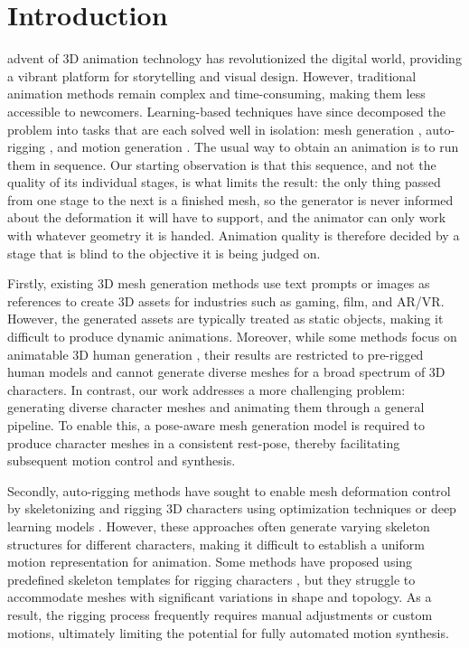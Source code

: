 \documentclass[lettersize,journal]{IEEEtran}
\begin{document}
\section{Introduction}
 advent of 3D animation technology has revolutionized the digital world, providing a vibrant platform for storytelling and visual design. However, traditional animation methods remain complex and time-consuming, making them less accessible to newcomers. Learning-based techniques have since decomposed the problem into tasks that are each solved well in isolation: mesh generation \cite{lei2023s, chen2024meshanything, siddiqui2024meshgpt}, auto-rigging \cite{xu2020rignet, xu2022morig, wang2025foundation}, and motion generation \cite{guo2020action2motion,zhang2024motiondiffuse}. The usual way to obtain an animation is to run them in sequence. Our starting observation is that this sequence, and not the quality of its individual stages, is what limits the result: the only thing passed from one stage to the next is a finished mesh, so the generator is never informed about the deformation it will have to support, and the animator can only work with whatever geometry it is handed. Animation quality is therefore decided by a stage that is blind to the objective it is being judged on.

Firstly, existing 3D mesh generation methods \cite{zhang2024clay, weng2025scaling} use text prompts or images as references to create 3D assets for industries such as gaming, film, and AR/VR. However, the generated assets are typically treated as static objects, making it difficult to produce dynamic animations. Moreover, while some methods focus on animatable 3D human generation \cite{yu2023monohuman, wen2024gomavatar}, their results are restricted to pre-rigged human models and cannot generate diverse meshes for a broad spectrum of 3D characters. In contrast, our work addresses a more challenging problem: generating diverse character meshes and animating them through a general pipeline. To enable this, a pose-aware mesh generation model is required to produce character meshes in a consistent rest-pose, thereby facilitating subsequent motion control and synthesis.

Secondly, auto-rigging methods have sought to enable mesh deformation control by skeletonizing and rigging 3D characters using optimization techniques \cite{baran2007automatic} or deep learning models \cite{xu2020rignet, xu2019predicting}. However, these approaches often generate varying skeleton structures for different characters, making it difficult to establish a uniform motion representation for animation. Some methods have proposed using predefined skeleton templates for rigging characters \cite{liu2019neuroskinning, li2021learning}, but they struggle to accommodate meshes with significant variations in shape and topology. As a result, the rigging process frequently requires manual adjustments or custom motions, ultimately limiting the potential for fully automated motion synthesis.
\end{document}
